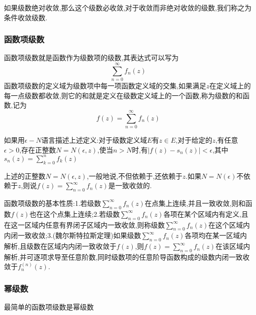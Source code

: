 \documentclass[zihao=-4,a4paper]{ctexart}
\begin{document}
如果级数绝对收敛,那么这个级数必收敛,对于收敛而非绝对收敛的级数,我们称之为条件收敛级数.

\subsubsection{函数项级数}

函数项级数就是函数作为级数项的级数,其表达式可以写为
\begin{equation}
	\sum^{\infty}_{n=0} {f}_{n} \left( {z} \right)
\end{equation}
函数项级数的定义域为级数项中每一项函数定义域的交集,如果满足$z$在定义域上的每一点级数都收敛,则它的和就是定义在级数定义域上的一个函数,称为级数的和函数,记为
\begin{equation}
	{f} \left( {z} \right) = \sum^{\infty}_{n=0} {f}_{n} \left( {z} \right)
\end{equation}

如果用${\epsilon} - {N}$语言描述上述定义:对于级数定义域$E$有$z {\in} E$,对于给定的$z$,有任意${\epsilon} > {0}$,存在正整数$N = N\left( {\epsilon} , {z} \right)$,使当${n} > {N}$时,有$| {f} \left( {z} \right) - {s}_{n} \left( {z} \right) | < {\epsilon}$,其中${s}_{n} \left( {z} \right) = \sum^{n}_{k=0} {f}_{k} \left( {z} \right)$

上述的正整数${N} = {N} \left( {\epsilon} , {z} \right)$,一般地说,不但依赖于,还依赖于$z$.如果${N} = {N} \left( {\epsilon} \right)$不依赖于$z$,则说${f} \left( {z} \right) = \sum^{\infty}_{n=0} {f}_{n} \left( {z} \right)$是一致收敛的.

函数项级数的基本性质:1.若级数$\sum^{\infty}_{n=0} {f}_{n} \left( {z} \right)$在点集上连续,并且一致收敛,则和函数${f} \left( {z} \right)$也在这个点集上连续;2.若级数$\sum^{\infty}_{n=0} {f}_{n} \left( {z} \right)$各项在某个区域内有定义,且在这一区域内任意有界闭子区域内一致收敛,则称级数$\sum^{\infty}_{n=0} {f}_{n} \left( {z} \right)$在这个区域内内闭一致收敛;3.(魏尔斯特拉斯定理)如果级数$\sum^{\infty}_{n=0} {f}_{n} \left( {z} \right)$各项均在某一区域内解析,且级数在区域内内闭一致收敛于${f} \left( {z} \right)$,则${f} \left( {z} \right) = \sum^{\infty}_{n=0} {f}_{n} \left( {z} \right)$在该区域内解析,并可逐项求导至任意阶数,同时级数项的任意阶导函数构成的级数内闭一致收敛于${f}^{\left( {n} \right)}_{n} \left( {z} \right)$.

\subsubsection{幂级数}

最简单的函数项级数是幂级数
\end{document}
